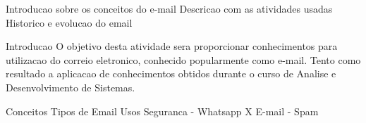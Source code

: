Introducao sobre os conceitos do e-mail
Descricao com as atividades usadas
Historico e evolucao do email

Introducao
O objetivo desta atividade sera proporcionar conhecimentos para utilizacao do correio eletronico, conhecido popularmente como e-mail. Tento como resultado a aplicacao de conhecimentos obtidos durante o curso de Analise e Desenvolvimento de Sistemas.

Conceitos
Tipos de Email
Usos
Seguranca
- Whatsapp X E-mail
- Spam
